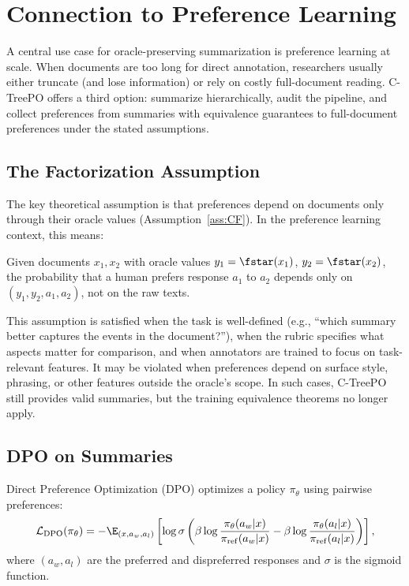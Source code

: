 \section{Connection to Preference Learning}\label{sec:preference}

A central use case for oracle-preserving summarization is preference learning at scale. When documents are too long for direct annotation, researchers usually either truncate (and lose information) or rely on costly full-document reading. C-TreePO offers a third option: summarize hierarchically, audit the pipeline, and collect preferences from summaries with equivalence guarantees to full-document preferences under the stated assumptions.

\subsection{The Factorization Assumption}

The key theoretical assumption is that preferences depend on documents only through their oracle values (Assumption~\ref{ass:CF}). In the preference learning context, this means:

\begin{assumption}\label{ass:pref}
Given documents $x_1, x_2$ with oracle values $y_1 = \fstar(x_1)$, $y_2 = \fstar(x_2)$, the probability that a human prefers response $a_1$ to $a_2$ depends only on $(y_1, y_2, a_1, a_2)$, not on the raw texts.
\end{assumption}

This assumption is satisfied when the task is well-defined (e.g., ``which summary better captures the events in the document?''), when the rubric specifies what aspects matter for comparison, and when annotators are trained to focus on task-relevant features. It may be violated when preferences depend on surface style, phrasing, or other features outside the oracle's scope. In such cases, C-TreePO still provides valid summaries, but the training equivalence theorems no longer apply.

\subsection{DPO on Summaries}

Direct Preference Optimization (DPO) \citep{RafailovEtAl2023DPO} optimizes a policy $\pi_\theta$ using pairwise preferences:
\[
\mathcal{L}_{\mathrm{DPO}}(\pi_\theta) = -\E_{(x, a_w, a_l)} \left[ \log \sigma\left( \beta \log \frac{\pi_\theta(a_w|x)}{\pi_{\mathrm{ref}}(a_w|x)} - \beta \log \frac{\pi_\theta(a_l|x)}{\pi_{\mathrm{ref}}(a_l|x)} \right) \right],
\]
where $(a_w, a_l)$ are the preferred and dispreferred responses and $\sigma$ is the sigmoid function.

